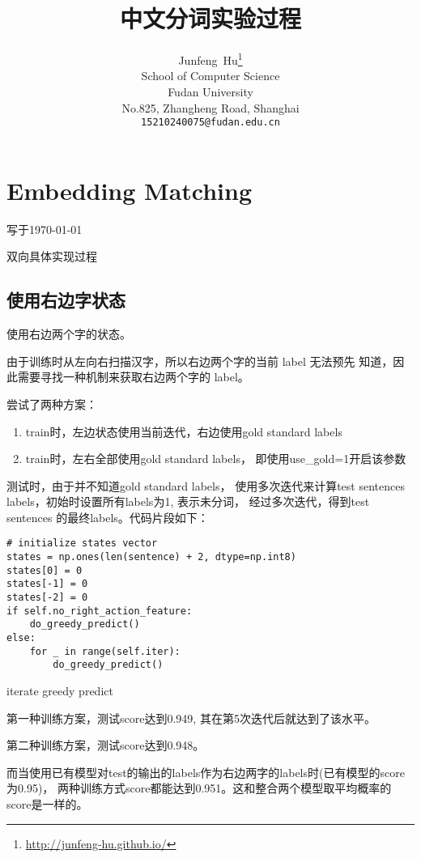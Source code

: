 \documentclass[]{article}
\title{中文分词实验过程}
\author{
	Junfeng~Hu\thanks{ \url{http://junfeng-hu.github.io/}} \\
	School of Computer Science\\
	Fudan University\\
	No.825, Zhangheng Road, Shanghai \\
	\texttt{15210240075@fudan.edu.cn} \\
}
\begin{document}
\maketitle



\section{Embedding Matching}

\small{
	写于\today \currenttime
}

双向具体实现过程

\subsection{使用右边字状态}
使用右边两个字的状态。

由于训练时从左向右扫描汉字，所以右边两个字的当前 label 无法预先
知道，因此需要寻找一种机制来获取右边两个字的 label。

尝试了两种方案：
\begin{enumerate}
	\item train时，左边状态使用当前迭代，右边使用gold standard labels
	\item train时，左右全部使用gold standard labels，
	    即使用use\_gold=1开启该参数
\end{enumerate}

测试时，由于并不知道gold standard labels，
使用多次迭代来计算test sentences labels，初始时设置所有labels为1, 表示未分词，
经过多次迭代，得到test sentences 的最终labels。代码片段如下：

\renewcommand\listingscaption{Code}
\begin{listing}[H]
\begin{verbatim}
# initialize states vector
states = np.ones(len(sentence) + 2, dtype=np.int8)
states[0] = 0
states[-1] = 0
states[-2] = 0
if self.no_right_action_feature:
    do_greedy_predict()
else:
    for _ in range(self.iter):
        do_greedy_predict()
\end{verbatim}
\caption{iterate greedy predict}
\end{listing}

第一种训练方案，测试score达到0.949, 其在第5次迭代后就达到了该水平。

第二种训练方案，测试score达到0.948。

而当使用已有模型对test的输出的labels作为右边两字的labels时(已有模型的score为0.95)，
两种训练方式score都能达到0.951。这和整合两个模型取平均概率的score是一样的。
\end{document}
